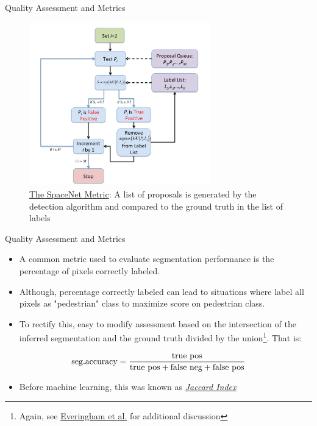 \documentclass[handout]{beamer}
\begin{document}
\begin{frame}{Quality Assessment and Metrics}
\begin{figure}
\centering
\includegraphics[width=0.7\textwidth]{../media/spacenet_perf_calc.png}
\caption{\href{https://medium.com/the-downlinq/the-spacenet-metric-612183cc2ddb}{\color{blue}The SpaceNet Metric}: A list of proposals is generated by the detection algorithm and compared to the ground truth in the list of labels}
\end{figure}
\end{frame}


\begin{frame}{Quality Assessment and Metrics}
\begin{itemize}
\itemsep 1em
	\item<1->A common metric used to evaluate segmentation performance is the percentage of pixels correctly labeled.  
	\item<2->Although, percentage correctly labeled can lead to situations where label all pixels as "pedestrian" class to maximize score on pedestrian class.
	\item<3->To rectify this, easy to modify assessment based on the intersection of the inferred segmentation and the ground truth divided by the union\footnote{Again, see \href{http://host.robots.ox.ac.uk/pascal/VOC/pubs/everingham10.html\#abstract}{\color{blue}Everingham et al.} for additional discussion}.  That is:
\end{itemize}
\begin{equation}
\centering
\text{seg.accuracy} = \frac{\text{true pos}}{\text{true pos}+\text{false neg}+\text{false pos}}
\end{equation}
\begin{itemize}
\itemsep 1em
	\item<4->Before machine learning, this was known as \href{https://en.wikipedia.org/wiki/Jaccard_index}{\color{blue}\emph{Jaccard Index}}
	\end{itemize}
\end{frame}
\end{document}
